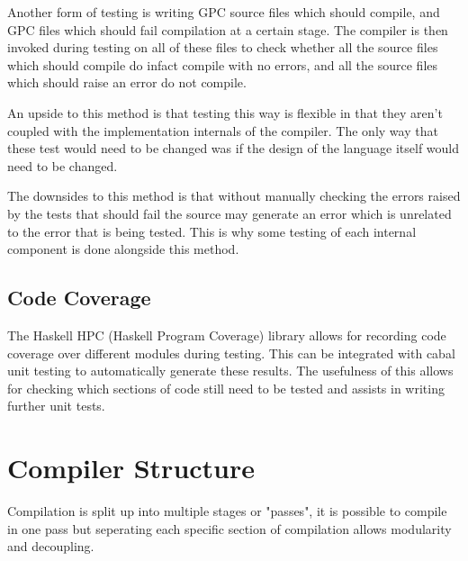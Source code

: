 Another form of testing is writing GPC source files which should compile, and
GPC files which should fail compilation at a certain stage. The compiler
is then invoked during testing on all of these files to check whether
all the source files which should compile do infact compile with no errors,
and all the source files which should raise an error do not compile.

An upside to this method is that testing this way is flexible in that
they aren't coupled with the implementation internals of the compiler.
The only way that these test would need to be changed was if the design
of the language itself would need to be changed.

The downsides to this method is that without manually checking the errors raised
by the tests that should fail the source may generate an error which is unrelated
to the error that is being tested. This is why some testing of each internal
component is done alongside this method.

\subsection{Code Coverage}

The Haskell HPC (Haskell Program Coverage) library allows for recording
code coverage over different modules during testing. This can be integrated with
cabal unit testing to automatically generate these results. The usefulness of this
allows for checking which sections of code still need to be tested and assists
in writing further unit tests.


\section{Compiler Structure}
Compilation is split up into multiple stages or "passes",
it is possible to compile in one pass but seperating each 
specific section of compilation allows modularity and decoupling.

